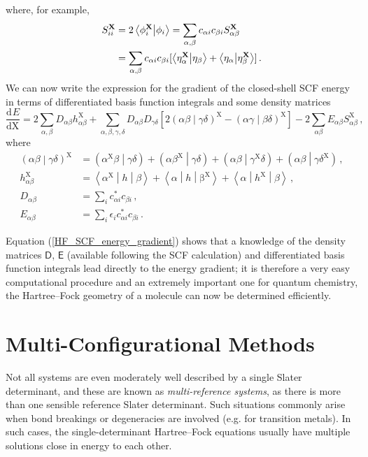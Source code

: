 \documentclass{article}
\theoremstyle{plain}\theoremheaderfont{\normalfont\itshape}\theorembodyfont{\rmfamily}\theoremseparator{.}\newtheorem*{rem}{Remark}\newtheorem*{ex}{Example}\newtheorem*{proof}{Proof}\newtheorem*{altp}{Alternative proof}
\theoremstyle{plain}\theoremheaderfont{\normalfont\bfseries}\theorembodyfont{\rmfamily}\theoremseparator{.}\newtheorem{thm}{Theorem}[section]\newtheorem{lem}[thm]{Lemma}\newtheorem{prop}[thm]{Proposition}\newtheorem*{cor}{Corollary}\newtheorem{defn}[thm]{Definition}\newtheorem{clm}[thm]{Claim}\newtheorem{clminproof}{Claim}
\theoremstyle{break}\theoremheaderfont{\normalfont\itshape}\theorembodyfont{\rmfamily}\theoremseparator{.\medskip}\newtheorem*{proofskip}{Proof}\newtheorem*{exs}{Examples}\newtheorem*{rems}{Remarks}
\theoremstyle{break}\theoremheaderfont{\normalfont\bfseries}\theorembodyfont{\rmfamily}\theoremseparator{.\medskip}\newtheorem{lemskip}[thm]{Lemma}\newtheorem{defnskip}[thm]{Definition}\newtheorem{propskip}[thm]{Proposition}\newtheorem{thmskip}[thm]{Theorem}
\numberwithin{equation}{section}
\newcommand{\dv}[3][]{\frac{\mathrm{d}^{#1} #2}{{\mathrm{d} #3}^{#1}}}
\newcommand{\braket}[2]{\left\langle #1 \middle| #2 \right\rangle}
\newcommand{\mel}[3]{\left\langle #1 \middle| #2 \middle| #3 \right\rangle}
\newcommand{\vb}[1]{\bm{\mathrm{#1}}}
\newcommand{\bracket}[2]{\left( #1 \middle| #2 \right)}
\begin{document}
    where, for example,
    \begin{align}
        S_{ii}^{\vb{X}}&=2\braket{\phi_i^{\vb{X}}}{\phi_i}=\sum_{\alpha,\beta}c_{\alpha i}c_{\beta i}S_{\alpha\beta}^{\vb{X}}\notag\\
        &=\sum_{\alpha,\beta}c_{\alpha i}c_{\beta i}[\braket{\eta_\alpha^{\vb{X}}}{\eta_\beta}+\braket{\eta_{\alpha}}{\eta_{\beta}^{\vb{X}}}]\,.
    \end{align}
    We can now write the expression for the gradient of the closed-shell SCF energy in terms of differentiated basis function integrals and some density matrices
    \begin{equation}\label{HF_SCF_energy_gradient}
        \dv{E}{\vb{X}}=2\sum_{\alpha,\beta}D_{\alpha\beta}h_{\alpha\beta}^{\vb{X}}+\sum_{\alpha,\beta,\gamma,\delta}D_{\alpha\beta}D_{\gamma\delta}[2\bracket{\alpha\beta}{\gamma\delta}^{\vb{X}}-\bracket{\alpha\gamma}{\beta\delta}^{\vb{X}}]-2\sum_{\alpha\beta}E_{\alpha\beta}S_{\alpha\beta}^{\vb{X}}\,,
    \end{equation}
    where
    \begin{align}
        \bracket{\alpha\beta}{\gamma\delta}^{\vb{X}}&=\bracket{\alpha^{\vb{X}}\beta}{\gamma\delta}+\bracket{\alpha\beta^{\vb{X}}}{\gamma\delta}+\bracket{\alpha\beta}{\gamma^{\vb{X}}\delta}+\bracket{\alpha\beta}{\gamma\delta^{\vb{X}}}\,,\\
        h_{\alpha\beta}^{\vb{X}}&=\mel{\alpha^{\vb{X}}}{h}{\beta}+\mel{\alpha}{h}{\vb{\beta}^{\vb{X}}}+\mel{\alpha}{h^{\vb{X}}}{\beta}\,,\\
        D_{\alpha\beta}&=\sum_{i} c_{\alpha i}^* c_{\beta i}\,,\\
        E_{\alpha\beta}&=\sum_{i} \epsilon_i c_{\alpha i}^* c_{\beta i}\,.
    \end{align}

    Equation (\ref{HF_SCF_energy_gradient}) shows that a knowledge of the density matrices \(\mathsf{D}\), \(\mathsf{E}\) (available following the SCF calculation) and differentiated basis function integrals lead directly to the energy gradient; it is therefore a very easy computational procedure and an extremely important one for quantum chemistry, the Hartree--Fock geometry of a molecule can now be determined efficiently.
    
    \newpage
    \section{Multi-Configurational Methods}
    Not all systems are even moderately well described by a single Slater determinant, and these are known as \textit{multi-reference systems}, as there is more than one sensible reference Slater determinant. Such situations commonly arise when bond breakings or degeneracies are involved (e.g. for transition metals). In such cases, the single-determinant Hartree--Fock equations usually have multiple solutions close in energy to each other.
\end{document}
